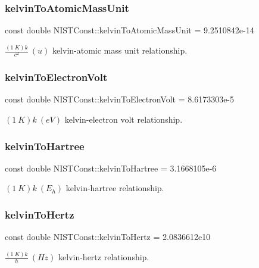 \subsubsection{\texorpdfstring{kelvin\+To\+Atomic\+Mass\+Unit}{kelvinToAtomicMassUnit}}
{\footnotesize\ttfamily const double N\+I\+S\+T\+Const\+::kelvin\+To\+Atomic\+Mass\+Unit = 9.\+2510842e-\/14}

$\frac{(1\ K)k}{c^2} \ (u)$ kelvin-\/atomic mass unit relationship. \mbox{\label{group___kelvin_gae61d97fa154d94e710c951a26bd47896}} 
\subsubsection{\texorpdfstring{kelvin\+To\+Electron\+Volt}{kelvinToElectronVolt}}
{\footnotesize\ttfamily const double N\+I\+S\+T\+Const\+::kelvin\+To\+Electron\+Volt = 8.\+6173303e-\/5}

$(1\ K)k \ (eV)$ kelvin-\/electron volt relationship. \mbox{\label{group___kelvin_gaece5622592a7f817204ca28c6d00d570}} 
\subsubsection{\texorpdfstring{kelvin\+To\+Hartree}{kelvinToHartree}}
{\footnotesize\ttfamily const double N\+I\+S\+T\+Const\+::kelvin\+To\+Hartree = 3.\+1668105e-\/6}

$(1\ K)k \ (E_h)$ kelvin-\/hartree relationship. \mbox{\label{group___kelvin_gaa426666c20c9b04efcdcfd05f5a90cd9}} 
\subsubsection{\texorpdfstring{kelvin\+To\+Hertz}{kelvinToHertz}}
{\footnotesize\ttfamily const double N\+I\+S\+T\+Const\+::kelvin\+To\+Hertz = 2.\+0836612e10}

$\frac{(1\ K)k}{h} \ (Hz)$ kelvin-\/hertz relationship. \mbox{\label{group___kelvin_ga361938b994609879a0377a94e49dacf2}} 

